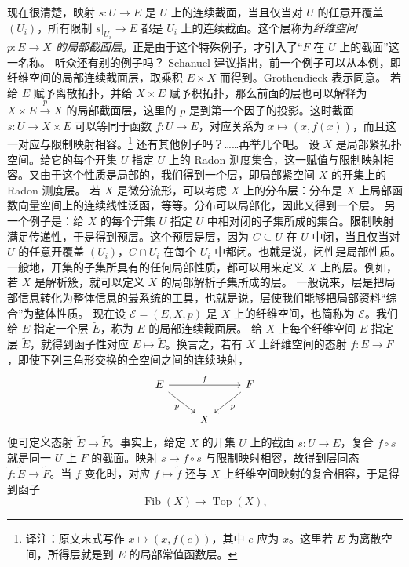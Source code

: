 现在很清楚，映射 $s\colon U\to E$ 是 $U$ 上的连续截面，当且仅当对 $U$ 的任意开覆盖 $(U_i)$，所有限制 $s|_{U_i}\to E$ 都是 $U_i$ 上的连续截面。这个层称为\emph{纤维空间 $p\colon E\to X$ 的局部截面层}。正是由于这个特殊例子，才引入了“$F$ 在 $U$ 上的截面”这一名称。
听众还有别的例子吗？
Schanuel 建议指出，前一个例子可以从本例，即纤维空间的局部连续截面层，取乘积 $E\times X$ 而得到。Grothendieck 表示同意。
若给 $E$ 赋予离散拓扑，并给 $X\times E$ 赋予积拓扑，那么前面的层也可以解释为 $X\times E\xrightarrow pX$ 的局部截面层，这里的 $p$ 是到第一个因子的投影。这时截面 $s\colon U\to X\times E$ 可以等同于函数 $f\colon U\to E$，对应关系为 $x\mapsto(x,f(x))$，而且这一对应与限制映射相容。\footnote{译注：原文末式写作 $x\mapsto(x,f(e))$，其中 $e$ 应为 $x$。这里若 $E$ 为离散空间，所得层就是到 $E$ 的局部常值函数层。}
还有其他例子吗？……再举几个吧。
设 $X$ 是局部紧拓扑空间。给它的每个开集 $U$ 指定 $U$ 上的 Radon 测度集合，这一赋值与限制映射相容。又由于这个性质是局部的，我们得到一个层，即局部紧空间 $X$ 的开集上的 Radon 测度层。
若 $X$ 是微分流形，可以考虑 $X$ 上的分布层：分布是 $X$ 上局部函数向量空间上的连续线性泛函，等等。分布可以局部化，因此又得到一个层。
另一个例子是：给 $X$ 的每个开集 $U$ 指定 $U$ 中相对闭的子集所成的集合。限制映射满足传递性，于是得到预层。这个预层是层，因为 $C\subseteq U$ 在 $U$ 中闭，当且仅当对 $U$ 的任意开覆盖 $(U_i)$，$C\cap U_i$ 在每个 $U_i$ 中都闭。也就是说，闭性是局部性质。
一般地，开集的子集所具有的任何局部性质，都可以用来定义 $X$ 上的层。例如，若 $X$ 是解析簇，就可以定义 $X$ 的局部解析子集所成的层。
一般说来，层是把局部信息转化为整体信息的最系统的工具，也就是说，层使我们能够把局部资料“综合”为整体性质。
现在设 $\mathcal E=(E,X,p)$ 是 $X$ 上的纤维空间，也简称为 $\mathcal E$。我们给 $E$ 指定一个层 $\widetilde E$，称为 $E$ 的局部连续截面层。
给 $X$ 上每个纤维空间 $E$ 指定层 $\widetilde E$，就得到函子性对应 $E\mapsto\widetilde E$。换言之，若有 $X$ 上纤维空间的态射 $f\colon E\to F$，即使下列三角形交换的全空间之间的连续映射，
\[
\begin{tikzcd}[ampersand replacement=\&]
E\arrow[rr,"f"]\arrow[dr,"p"']\&\&F\arrow[dl,"p"]\\
\&X\&
\end{tikzcd}
\]
便可定义态射 $\widetilde E\to\widetilde F$。事实上，给定 $X$ 的开集 $U$ 上的截面 $s\colon U\to E$，复合 $f\circ s$ 就是同一 $U$ 上 $F$ 的截面。映射 $s\mapsto f\circ s$ 与限制映射相容，故得到层同态 $\widetilde f\colon\widetilde E\to\widetilde F$。当 $f$ 变化时，对应 $f\mapsto\widetilde f$ 还与 $X$ 上纤维空间映射的复合相容，于是得到函子
\begin{equation}\tag{1.3}
 \operatorname{Fib}(X)\longrightarrow\operatorname{Top}(X),
\end{equation}
